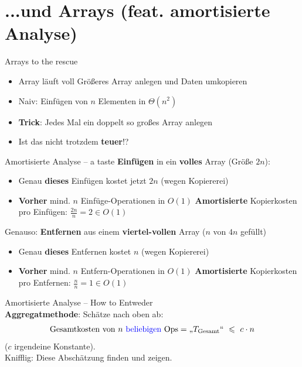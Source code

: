 \section{...und Arrays (feat. amortisierte Analyse)}

\begin{frame}{Arrays to the rescue}
	\begin{itemize}
		\item Array läuft voll \impl Größeres Array anlegen und Daten umkopieren
		\pause
		\item Naiv: Einfügen von $n$ Elementen in $\Theta(n^2)$
		\pause
		\item \textbf{Trick}: Jedes Mal ein doppelt so großes Array anlegen
		\item Ist das nicht trotzdem \textbf{teuer}!?
	\end{itemize}
\end{frame}

\begin{frame}{Amortisierte Analyse – a taste}
	\textbf{Einfügen} in ein \textbf{volles} Array (Größe $2n$):
	\begin{itemize}
		\implitem Array muss vergrößert (also umkopiert werden)
		\pause
		\item Genau \textbf{dieses} Einfügen kostet jetzt $2n$ (wegen Kopiererei)
		\pause
		\item \textbf{Vorher} mind. $n$ Einfüge-Operationen  in $O(1)$
		\pause
		\implitem \textbf{Amortisierte} Kopierkosten pro Einfügen: $\frac{2n}{n} = 2 \in O(1)$
	\end{itemize} \pause
	\forcenewline
	Genauso: \textbf{Entfernen} aus einem \textbf{viertel-vollen} Array ($n$ von $4n$ gefüllt)
	\begin{itemize} 
		\implitem Array muss verkleinert ($=$ umkopiert) werden
		\pause
		\item Genau \textbf{dieses} Entfernen kostet $n$ (wegen Kopiererei)
		\pause
		\item \textbf{Vorher} mind. $n$ Entfern-Operationen  in $O(1)$
		\pause
		\implitem \textbf{Amortisierte} Kopierkosten pro Entfernen: $\frac{n}{n} = 1 \in O(1)$
	\end{itemize}
\end{frame}

\begin{frame}{Amortisierte Analyse – How to}
	Entweder \\
	\textbf{Aggregatmethode}: Schätze nach oben ab:
	\[
		\text{Gesamtkosten von $n$ \textcolor{blue}{beliebigen} Ops} = \text{„}T_\text{Gesamt}\text{“} \ \leq \ c \cdot n 
	\]
	($c$ irgendeine Konstante). \\ \forcenewline
	Knifflig: Diese Abschätzung finden und zeigen.
\end{frame}

